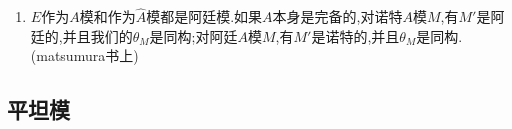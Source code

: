 \begin{enumerate}
\begin{proof}
    	因为$E$中每个元可以被$\mathfrak{m}$的某个次幂零化,所以每个$A$模同态$E\to E$都可以视为$\widehat{A}$模同态,所以有$\mathrm{Hom}_{\widehat{A}}(E,E)=\mathrm{Hom}_A(E,E)$.接下来对每个正整数$v$,记$E_v=\{x\in E\mid\mathfrak{m}^vx=0\}$,那么有$(A/\mathfrak{m}^v)'=\mathrm{Hom}_A(A/\mathfrak{m}^v,E)\cong E_v$.并且有$\mathrm{Hom}_A(E_v,E_v)\cong\mathrm{Hom}_A(E_v,E)=E_v'\cong(A/\mathfrak{m}^v)''$.按照第二条有$(A/\mathfrak{m}^v)''\cong A/\mathfrak{m}^v$.于是我们证明了有典范同构$A/\mathfrak{m}^v\cong\mathrm{Hom}_A(E_v,E)$.接下来按照$E=\cup_vE_v$,所以可以写成正向极限$E=\lim\limits_{\rightarrow}E_v$,于是有$\mathrm{Hom}_A(E,E)=\mathrm{Hom}_A(\lim\limits_{\rightarrow}E_v,E)=\lim\limits_{\leftarrow}\mathrm{Hom}_A(E_v,E)=\lim\limits_{\leftarrow}A/\mathfrak{m}^v=\widehat{A}$.
    \end{proof}
    \item $E$作为$A$模和作为$\widehat{A}$模都是阿廷模.如果$A$本身是完备的,对诺特$A$模$M$,有$M'$是阿廷的,并且我们的$\theta_M$是同构;对阿廷$A$模$M$,有$M'$是诺特的,并且$\theta_M$是同构.(matsumura书上)
\end{enumerate}
\newpage
\subsection{平坦模}

